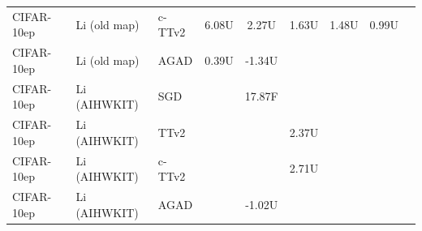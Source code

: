 \begin{table}[t]
\begin{tabular}{lllcccccc}
CIFAR-10ep & Li (old map) & c-TTv2 & 6.08U & 2.27U & 1.63U & 1.48U & 0.99U & \\
CIFAR-10ep & Li (old map) & AGAD & 0.39U & -1.34U &  &  &  & \\
CIFAR-10ep & Li (AIHWKIT) & SGD &  & 17.87F &  &  &  & \\
CIFAR-10ep & Li (AIHWKIT) & TTv2 &  &  & 2.37U &  &  & \\
CIFAR-10ep & Li (AIHWKIT) & c-TTv2 &  &  & 2.71U &  &  & \\
CIFAR-10ep & Li (AIHWKIT) & AGAD &  & -1.02U &  &  &  & \\
\bottomrule\end{tabular}\end{table}
